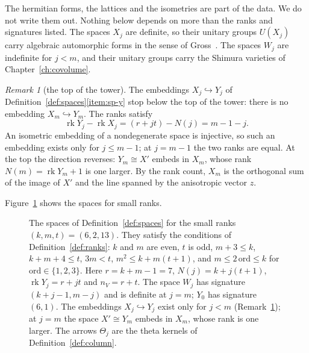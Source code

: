 \documentclass[11pt]{amsbook}
\theoremstyle{plain}
\theoremstyle{definition}
\theoremstyle{remark}
\newtheorem{remark}[theorem]{Remark}
\numberwithin{equation}{section}
\numberwithin{figure}{chapter}
\numberwithin{table}{chapter}
\newcommand{\rk}{\operatorname{rk}}
\begin{document}
\noindent The hermitian forms, the lattices and the isometries are part
of the data. We do not write them out. Nothing below depends on more
than the ranks and signatures listed. The spaces $X_j$ are definite, so
their unitary groups $U(X_j)$ carry algebraic automorphic forms in the
sense of Gross~\cite{Gross1999}. The spaces $W_j$ are indefinite for
$j<m$, and their unitary groups carry the Shimura varieties of
Chapter~\ref{ch:covolume}.

\begin{remark}[the top of the tower]\label{rem:topspace}
The embeddings $X_j\hookrightarrow Y_j$ of
Definition~\ref{def:spaces}\ref{item:sp-y} stop below the top of the
tower: there is no embedding $X_m\hookrightarrow Y_m$. The ranks
satisfy
\[
\rk Y_j-\rk X_j=(r+jt)-N(j)=m-1-j.
\]
An isometric embedding of a nondegenerate space is injective, so such
an embedding exists only for $j\le m-1$; at $j=m-1$ the two ranks are
equal. At the top the direction reverses: $Y_m\cong X'$ embeds in
$X_m$, whose rank $N(m)=\rk Y_m+1$ is one larger. By the rank count,
$X_m$ is the orthogonal sum of the image of $X'$ and the line spanned
by the anisotropic vector $z$.
\end{remark}

\noindent Figure~\ref{fig:tower} shows the spaces for small ranks.

\begin{figure}[htbp]
\centering

\caption{The spaces of Definition~\ref{def:spaces} for the small ranks
$(k,m,t)=(6,2,13)$. They satisfy the conditions of
Definition~\ref{def:ranks}: $k$ and $m$ are even, $t$ is odd,
$m+3\le k$, $k+m+4\le t$, $3m<t$, $m^2\le k+m(t+1)$, and
$m\le2\,\mathrm{ord}\le k$ for $\mathrm{ord}\in\{1,2,3\}$. Here
$r=k+m-1=7$, $N(j)=k+j(t+1)$, $\rk Y_j=r+jt$ and $n_V=r+t$. The space
$W_j$ has signature $(k+j-1,m-j)$ and is definite at $j=m$; $Y_0$ has
signature $(6,1)$. The embeddings $X_j\hookrightarrow Y_j$ exist only
for $j<m$ (Remark~\ref{rem:topspace}); at $j=m$ the space $X'\cong
Y_m$ embeds in $X_m$, whose rank is one larger. The arrows $\Theta_j$
are the theta kernels of Definition~\ref{def:column}.}
\label{fig:tower}
\end{figure}
\end{document}
